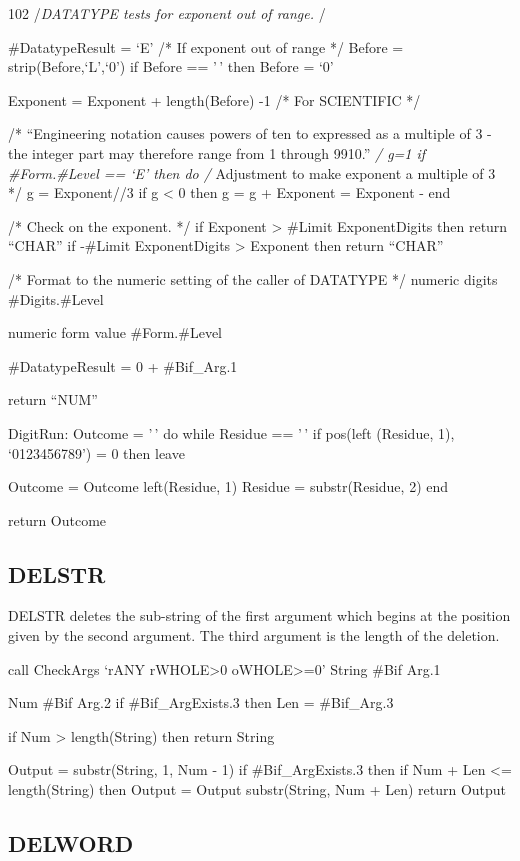 102 /\emph{DATATYPE tests for exponent out of range. }/

\#DatatypeResult = `E' /* If exponent out of range */ Before =
strip(Before,`L',`0') if Before == '\,' then Before = `0'

Exponent = Exponent + length(Before) -1 /* For SCIENTIFIC */

/* ``Engineering notation causes powers of ten to expressed as a
multiple of 3 - the integer part may therefore range from 1 through
9910.'' \emph{/ g=1 if \#Form.\#Level == `E' then do /} Adjustment to
make exponent a multiple of 3 */ g = Exponent//3 if g \textless{} 0 then
g = g + Exponent = Exponent - end

/* Check on the exponent. */ if Exponent \textgreater{} \#Limit
ExponentDigits then return ``CHAR'' if -\#Limit ExponentDigits
\textgreater{} Exponent then return ``CHAR''

/* Format to the numeric setting of the caller of DATATYPE */ numeric
digits \#Digits.\#Level

numeric form value \#Form.\#Level

\#DatatypeResult = 0 + \#Bif\_Arg.1

return ``NUM''

DigitRun: Outcome = '\,' do while Residue == '\,' if pos(left (Residue,
1), `0123456789') = 0 then leave

Outcome = Outcome \textbar\textbar{} left(Residue, 1) Residue =
substr(Residue, 2) end

return Outcome

\subsection{DELSTR}\label{delstr}

DELSTR deletes the sub-string of the first argument which begins at the
position given by the second argument. The third argument is the length
of the deletion.

call CheckArgs `rANY rWHOLE\textgreater0 oWHOLE\textgreater=0' String
\#Bif Arg.1

Num \#Bif Arg.2 if \#Bif\_ArgExists.3 then Len = \#Bif\_Arg.3

if Num \textgreater{} length(String) then return String

Output = substr(String, 1, Num - 1) if \#Bif\_ArgExists.3 then if Num +
Len \textless= length(String) then Output = Output \textbar\textbar{}
substr(String, Num + Len) return Output

\subsection{DELWORD}\label{delword}

